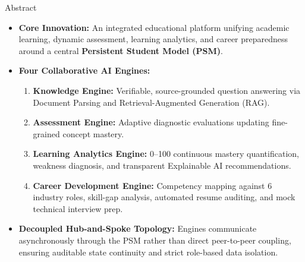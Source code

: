 \documentclass[aspectratio=169,10pt]{beamer}
\begin{document}
\begin{frame}{Abstract}
  \begin{itemize}
    \item \textbf{Core Innovation:} An integrated educational platform unifying academic learning, dynamic assessment, learning analytics, and career preparedness around a central \textbf{Persistent Student Model (PSM)}.
    \item \textbf{Four Collaborative AI Engines:}
      \begin{enumerate}
        \item \textbf{Knowledge Engine:} Verifiable, source-grounded question answering via Document Parsing and Retrieval-Augmented Generation (RAG).
        \item \textbf{Assessment Engine:} Adaptive diagnostic evaluations updating fine-grained concept mastery.
        \item \textbf{Learning Analytics Engine:} 0--100 continuous mastery quantification, weakness diagnosis, and transparent Explainable AI recommendations.
        \item \textbf{Career Development Engine:} Competency mapping against 6 industry roles, skill-gap analysis, automated resume auditing, and mock technical interview prep.
      \end{enumerate}
    \item \textbf{Decoupled Hub-and-Spoke Topology:} Engines communicate asynchronously through the PSM rather than direct peer-to-peer coupling, ensuring auditable state continuity and strict role-based data isolation.
  \end{itemize}
\end{frame}
\end{document}
